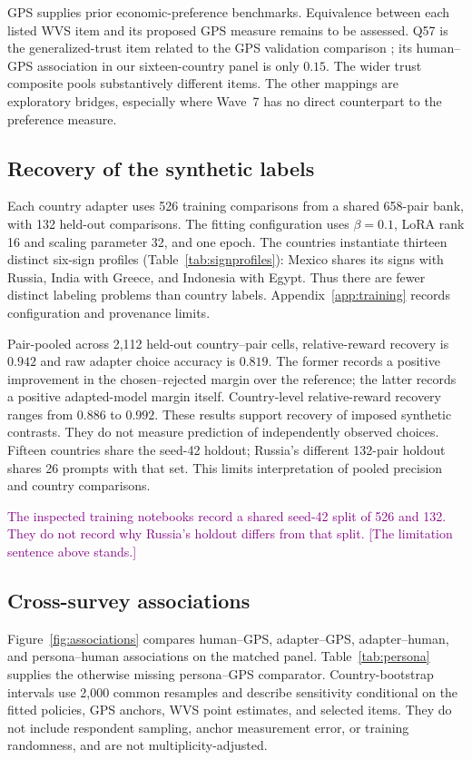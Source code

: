 GPS supplies prior economic-preference benchmarks. Equivalence between each listed WVS item and its proposed GPS measure remains to be assessed. Q57 is the generalized-trust item related to the GPS validation comparison \cite{falk2018}; its human--GPS association in our sixteen-country panel is only $0.15$. The wider trust composite pools substantively different items. The other mappings are exploratory bridges, especially where Wave~7 has no direct counterpart to the preference measure.

\subsection{Recovery of the synthetic labels}
Each country adapter uses 526 training comparisons from a shared 658-pair bank, with 132 held-out comparisons. The fitting configuration uses $\beta=0.1$, LoRA rank 16 and scaling parameter 32, and one epoch. The countries instantiate thirteen distinct six-sign profiles (Table~\ref{tab:signprofiles}): Mexico shares its signs with Russia, India with Greece, and Indonesia with Egypt. Thus there are fewer distinct labeling problems than country labels. Appendix~\ref{app:training} records configuration and provenance limits.


Pair-pooled across 2,112 held-out country--pair cells, relative-reward recovery is $0.942$ and raw adapter choice accuracy is $0.819$. The former records a positive improvement in the chosen--rejected margin over the reference; the latter records a positive adapted-model margin itself. Country-level relative-reward recovery ranges from $0.886$ to $0.992$. These results support recovery of imposed synthetic contrasts. They do not measure prediction of independently observed choices. Fifteen countries share the seed-42 holdout; Russia's different 132-pair holdout shares 26 prompts with that set. This limits interpretation of pooled precision and country comparisons.

\textcolor{purple}{The inspected training notebooks record a shared seed-42 split of 526 and 132. They do not record why Russia's holdout differs from that split. [The limitation sentence above stands.]}

\subsection{Cross-survey associations}
Figure~\ref{fig:associations} compares human--GPS, adapter--GPS, adapter--human, and persona--human associations on the matched panel. Table~\ref{tab:persona} supplies the otherwise missing persona--GPS comparator. Country-bootstrap intervals use 2,000 common resamples and describe sensitivity conditional on the fitted policies, GPS anchors, WVS point estimates, and selected items. They do not include respondent sampling, anchor measurement error, or training randomness, and are not multiplicity-adjusted.

